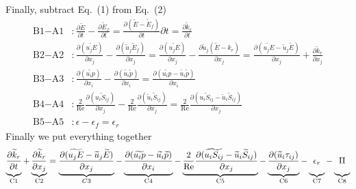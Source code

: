 \documentclass[11pt]{article}
\begin{document}
\begin{enumerate}
{Finally, subtract Eq.~(1) from Eq.~(2)
\begin{align*}
\text{B1}-\text{A1}&: \frac{\partial \widetilde E}{\partial t} - \frac{\partial \widetilde E_f}{\partial t} = \frac{\partial (\widetilde E - \widetilde E_f)}{\partial t}{\partial t}  = \frac{\partial \widetilde k_r}{\partial t}\\
\text{B2}-\text{A2}&: \frac{\partial (\widetilde{u_j E})}{\partial x_j} - \frac{\partial (\widetilde u_j \widetilde E_f)}{\partial x_j} = \frac{\partial (\widetilde{u_j E})}{\partial x_j} - \frac{\partial \widetilde u_j (\widetilde{E} -k_r)}{\partial x_j} = \frac{\partial (\widetilde{u_j E} - \widetilde u_j \widetilde{E})}{\partial x_j} + \frac{\partial \widetilde k_r}{\partial x_j}\\
\text{B3}-\text{A3}&: \frac{\partial (\widetilde {u_i p})}{\partial x_i} - \frac{\partial (\widetilde {u_i} \widetilde{p})}{\partial x_i} = \frac{\partial (\widetilde {u_i p} - \widetilde {u_i} \widetilde{p} )}{\partial x_i}\\
\text{B4}-\text{A4}&: \frac{2}{\text{Re}}\frac{\partial (\widetilde{u_i S_{ij}})}{\partial x_j} - \frac{2}{\text{Re}}\frac{\partial (\widetilde u_i \widetilde S_{ij})}{\partial x_j} = \frac{2}{\text{Re}}\frac{\partial (\widetilde{u_i S_{ij}} - \widetilde u_i \widetilde S_{ij} )}{\partial x_j}\\
\text{B5}-\text{A5}&: \epsilon - \epsilon_f = \epsilon_r
\end{align*}
Finally we put everything together
\begin{align*}
\underbrace{\vphantom{ \widetilde u_j\frac{\partial \widetilde E_f}{\partial x_j}}  \frac{\partial \widetilde k_r}{\partial t}}_{\text{C1}} + \underbrace{\frac{\partial \widetilde k_r}{\partial x_j}}_{\text{C2}} = \underbrace{\frac{\partial (\widetilde{u_j E} - \widetilde u_j \widetilde{E})}{\partial x_j}}_{C3} -\underbrace{\vphantom{ \widetilde u_j\frac{\partial \widetilde E_f}{\partial x_j}}\frac{\partial (\widetilde {u_i p} - \widetilde {u_i} \widetilde{p} )}{\partial x_i}}_{\text{C4}} - \underbrace{\vphantom{ \widetilde u_j\frac{\partial \widetilde E_f}{\partial x_j}}\frac{2}{\text{Re}}\frac{\partial (\widetilde{u_i S_{ij}} - \widetilde u_i \widetilde S_{ij} )}{\partial x_j}}_{\text{C5}} - \underbrace{\vphantom{ \widetilde u_j\frac{\partial \widetilde E_f}{\partial x_j}}\frac{\partial (\widetilde u_i \tau_{ij})}{\partial x_j}}_{\text{C6}} -\underbrace{\vphantom{ \widetilde u_j\frac{\partial \widetilde E_f}{\partial x_j}}\epsilon_r}_{\text{C7}} -\underbrace{\vphantom{ \widetilde u_j\frac{\partial \widetilde E_f}{\partial x_j}}\Pi}_{\text{C8}}

\end{align*}}
\end{enumerate}
\end{document}
